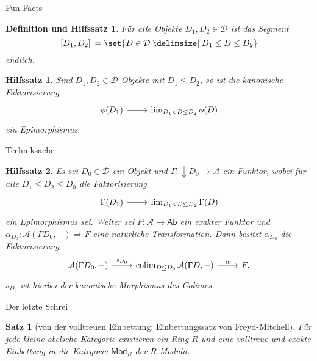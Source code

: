 \documentclass[usenames, dvipsnames]{beamer}
\newtheorem{hilfssatz}{Hilfssatz}
\newtheorem{satz}{Satz}
\newtheorem{defle}{Definition und Hilfssatz}
\newcommand\ccat\mathsf
\newcommand\cat\mathcal
\newcommand{\down}[1]{{\downarrow}#1}
\newcommand{\n}{\pgfmatrixnextcell}
\newcommand\nat\Rightarrow
\DeclareMathOperator{\colim}{colim}
\begin{document}
	\begin{frame}{Fun Facts}
		\begin{defle}
			Für alle Objekte $D_1,D_2\in\cat{D}$ ist das Segment
				\[
					[D_1, D_2] \coloneqq\set{D\in\cat{D}\given D_1\leq D\leq D_2}
				\]
			endlich.
		\end{defle}\pause
		\begin{hilfssatz}
			Sind $D_1, D_2\in\cat{D}$ Objekte mit $D_1\leq D_2$, so ist die kanonische Faktorisierung
			\[
				\begin{tikzcd}
					\phi(D_1) \arrow[r] \n \lim_{D_1<D\leq D_2}\phi(D)
				\end{tikzcd}
			\]
			ein Epimorphismus.
		\end{hilfssatz}
	\end{frame}
	\begin{frame}{Techniksache}
		\begin{hilfssatz}
			Es sei $D_0\in\cat{D}$ ein Objekt und $\Gamma\colon \down{D_0}\to\cat{A}$
			ein Funktor, wobei für alle $D_1\leq D_2\leq D_0$ die Faktorisierung
			\[
				\begin{tikzcd}
					\Gamma(D_1) \arrow[r] \n \lim_{D_1<D\leq D_2} \Gamma(D)
				\end{tikzcd}
			\]
			ein Epimorphismus sei. Weiter sei $F\colon\cat{A}\to\ccat{Ab}$ ein exakter
			Funktor und $\alpha_{D_0}\colon \cat{A}(\Gamma D_0, {-})\nat F$
			eine natürliche Transformation. Dann besitzt $\alpha_{D_0}$ die
			Faktorisierung
			\[
				\begin{tikzcd}
					\cat{A}(\Gamma D_0, {-}) \arrow{r}{s_{D_0}} \n \colim_{D\leq D_0}\cat{A}(\Gamma D, {-}) \arrow{r}{\alpha} \n F.
				\end{tikzcd}
			\]
			$s_{D_0}$ ist hierbei der kanonische Morphismus des Colimes.
		\end{hilfssatz}
	\end{frame}
	\begin{frame}{Der letzte Schrei}
		\begin{satz}[von der volltreuen Einbettung; Einbettungssatz von Freyd-Mitchell]
			Für jede kleine abelsche Kategorie existieren ein Ring $R$ und eine volltreue
			und exakte Einbettung in die Kategorie $\ccat{Mod}_R$ der $R$-Moduln.
		\end{satz}
	\end{frame}
\end{document}
